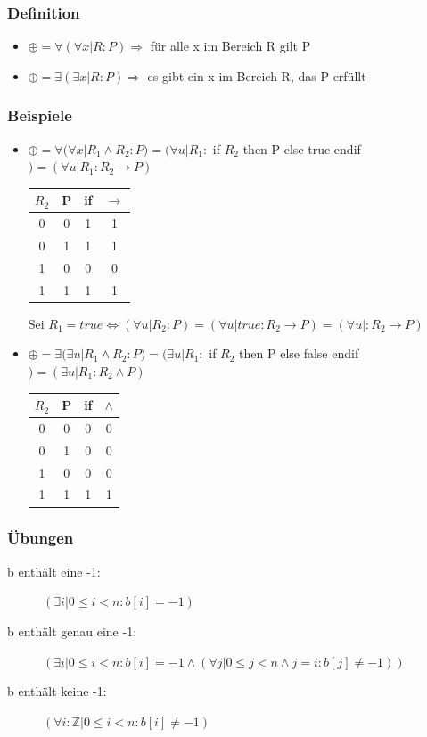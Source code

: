 \documentclass[a4paper,10pt]{article}
\newcommand{\ZN}{\mathbb{Z}} %
\newcommand{\ra}{\rightarrow}
\begin{document}
\subsubsection{Definition}
\begin{itemize}
	\item $ \oplus =\forall  (\forall x | R:P) \Longrightarrow$ f\"ur alle x im Bereich R gilt P
	\item $ \oplus =\exists  (\exists x | R:P) \Longrightarrow$ es gibt ein x im Bereich R, das P erf\"ullt
\end{itemize}

\subsubsection{Beispiele}

\begin{itemize}
	\item $ \oplus =\forall  (\forall x | R_1 \wedge R_2:P)=(\forall u | R_1:$ if $R_2$ then P else true endif $)=(\forall u | R_1:R_2\rightarrow P)$ \\
	\begin{tabular}{| c c | c c |}
		\hline
			$R_2$ & P & if & $\rightarrow$ \\
		\hline
			0 & 0 & 1 & 1 \\
			0 & 1 & 1 & 1 \\
			1 & 0 & 0 & 0 \\
			1 & 1 & 1 & 1 \\
		\hline
	\end{tabular} Sei $R_1 = true \Longleftrightarrow (\forall u | R_2:P)=(\forall u | true: R_2 \ra P)=(\forall u |:R_2\ra P)$ \\
	\item  $\oplus = \exists (\exists u | R_1 \wedge R_2:P)=(\exists u | R_1:$ if $R_2$ then P else false endif$)=(\exists u | R_1:R_2 \wedge P)$ \\
	\begin{tabular}{| c c | c c |}
		\hline
			$R_2$ & P & if & $\wedge$ \\
		\hline
			0 & 0 & 0 & 0 \\
			0 & 1 & 0 & 0 \\
			1 & 0 & 0 & 0 \\
			1 & 1 & 1 & 1 \\
		\hline
	\end{tabular}
\end{itemize}

\subsubsection{\"Ubungen}
\begin{description}
	\item[b enth\"alt eine -1:]  $ (\exists i | 0 \leq i < n: b[i]=-1)$
	\item[b enth\"alt genau eine -1:] $(\exists i | 0 \leq i < n: b[i]=-1 \wedge (\forall j | 0\leq j < n \wedge j=i : b[j]\neq-1))$
	\item[b enth\"alt keine -1:]  $(\forall i:\ZN|0\leq i < n : b[i]\neq-1)$
\end{description}
\end{document}
